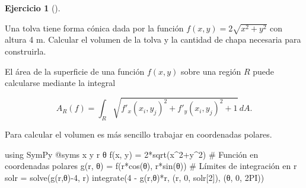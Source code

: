 \documentclass[
  a4paper,
]{scrreport}
\newenvironment{Shaded}{\begin{snugshade}}{\end{snugshade}}
\newcommand{\BuiltInTok}[1]{\textcolor[rgb]{0.00,0.23,0.31}{#1}}
\newcommand{\CommentTok}[1]{\textcolor[rgb]{0.37,0.37,0.37}{#1}}
\newcommand{\FloatTok}[1]{\textcolor[rgb]{0.68,0.00,0.00}{#1}}
\newcommand{\FunctionTok}[1]{\textcolor[rgb]{0.28,0.35,0.67}{#1}}
\newcommand{\ImportTok}[1]{\textcolor[rgb]{0.00,0.46,0.62}{#1}}
\newcommand{\NormalTok}[1]{\textcolor[rgb]{0.00,0.23,0.31}{#1}}
\newcommand{\OperatorTok}[1]{\textcolor[rgb]{0.37,0.37,0.37}{#1}}
\newcommand{\PreprocessorTok}[1]{\textcolor[rgb]{0.68,0.00,0.00}{#1}}
\theoremstyle{definition}
\newtheorem{exercise}{Ejercicio}[chapter]
\theoremstyle{remark}
\begin{document}
\begin{exercise}[]\protect\hypertarget{exr-area-superficie}{}\label{exr-area-superficie}

Una tolva tiene forma cónica dada por la función
\(f(x,y)=2\sqrt{x^2+y^2}\) con altura 4 m. Calcular el volumen de la
tolva y la cantidad de chapa necesaria para construirla.

\begin{tcolorbox}[enhanced jigsaw, opacitybacktitle=0.6, bottomrule=.15mm, opacityback=0, colback=white, left=2mm, coltitle=black, rightrule=.15mm, breakable, bottomtitle=1mm, leftrule=.75mm, title=\textcolor{quarto-callout-note-color}{\faInfo}\hspace{0.5em}{Ayuda}, titlerule=0mm, toptitle=1mm, colbacktitle=quarto-callout-note-color!10!white, colframe=quarto-callout-note-color-frame, toprule=.15mm, arc=.35mm]

El área de la superficie de una función \(f(x,y)\) sobre una región
\(R\) puede calcularse mediante la integral

\[
A_{R}(f) = \int_R \sqrt{f'_x(x_i,y_j)^2 + f'_y(x_i,y_j)^2 + 1}\,dA.
\]

\end{tcolorbox}

\begin{tcolorbox}[enhanced jigsaw, opacitybacktitle=0.6, bottomrule=.15mm, opacityback=0, colback=white, left=2mm, coltitle=black, rightrule=.15mm, breakable, bottomtitle=1mm, leftrule=.75mm, title=\textcolor{quarto-callout-tip-color}{\faLightbulb}\hspace{0.5em}{Solución}, titlerule=0mm, toptitle=1mm, colbacktitle=quarto-callout-tip-color!10!white, colframe=quarto-callout-tip-color-frame, toprule=.15mm, arc=.35mm]

Para calcular el volumen es más sencillo trabajar en coordenadas
polares.

\begin{Shaded}
\begin{Highlighting}[]
\ImportTok{using} \BuiltInTok{SymPy}
\PreprocessorTok{@syms}\NormalTok{ x y r θ}
\FunctionTok{f}\NormalTok{(x, y) }\OperatorTok{=} \FloatTok{2}\FunctionTok{*sqrt}\NormalTok{(x}\OperatorTok{\^{}}\FloatTok{2}\OperatorTok{+}\NormalTok{y}\OperatorTok{\^{}}\FloatTok{2}\NormalTok{)}
\CommentTok{\# Función en coordenadas polares}
\FunctionTok{g}\NormalTok{(r, θ) }\OperatorTok{=} \FunctionTok{f}\NormalTok{(}\FunctionTok{r*cos}\NormalTok{(θ), }\FunctionTok{r*sin}\NormalTok{(θ))}
\CommentTok{\# Límites de integración en r}
\NormalTok{solr }\OperatorTok{=} \FunctionTok{solve}\NormalTok{(}\FunctionTok{g}\NormalTok{(r,θ)}\OperatorTok{{-}}\FloatTok{4}\NormalTok{, r)}
\FunctionTok{integrate}\NormalTok{(}\FloatTok{4} \OperatorTok{{-}} \FunctionTok{g}\NormalTok{(r,θ)}\OperatorTok{*}\NormalTok{r, (r, }\FloatTok{0}\NormalTok{, solr[}\FloatTok{2}\NormalTok{]), (θ, }\FloatTok{0}\NormalTok{, }\FloatTok{2}\NormalTok{PI))}
\end{Highlighting}
\end{Shaded}


\end{tcolorbox}
\end{exercise}
\end{document}
